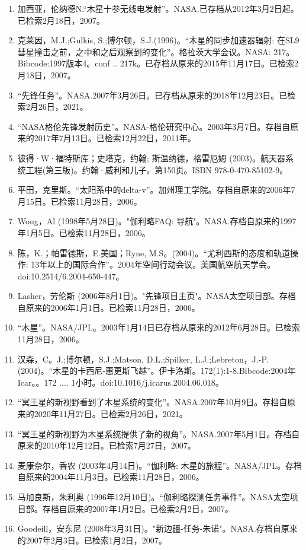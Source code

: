 \begin{enumerate}
\item 加西亚，伦纳德N.“木星十参无线电发射”。NASA.已存档从2012年3月2日起。已检索2月18日，2007。
\item 克莱因，M.J.;Gulkis, S.;博尔顿，S.J.(1996)。“木星的同步加速器辐射: 在SL9彗星撞击之前，之中和之后观察到的变化”。格拉茨大学会议。NASA: 217。Bibcode:1997版本4。conf .. 217k。已存档从原来的2015年11月17日。已检索2月18日，2007。
\item “先锋任务”。NASA.2007年3月26日。已存档从原来的2018年12月23日。已检索2月26日，2021。
\item “NASA格伦先锋发射历史”。NASA-格伦研究中心。2003年3月7日。存档自原来的2017年7月13日。已检索12月22日，2011年。
\item 彼得·W·福特斯库；史塔克，约翰; 斯温纳德，格雷厄姆 (2003)。航天器系统工程(第三版)。约翰·威利和儿子。第150页。ISBN 978-0-470-85102-9。
\item 平田，克里斯。“太阳系中的delta-v”。加州理工学院。存档自原来的2006年7月15日。已检索11月28日，2006。
\item Wong，Al (1998年5月28日)。"伽利略FAQ: 导航"。NASA.存档自原来的1997年1月5日。已检索11月28日，2006。
\item 陈，K.；帕雷德斯，E.美国；Ryne, M.S。(2004)。“尤利西斯的态度和轨道操作: 13年以上的国际合作”。2004年空间行动会议。美国航空航天学会。doi:10.2514/6.2004-650-447。
\item Lasher，劳伦斯 (2006年8月1日)。"先锋项目主页"。NASA太空项目部。存档自原来的2006年1月1日。已检索11月28日，2006。
\item “木星”。NASA/JPL。2003年1月14日已存档从原来的2012年6月28日。已检索11月28日，2006。
\item 汉森，C。J.;博尔顿，S.J.;Matson, D.L.;Spilker, L.J.;Lebreton，J.-P.(2004)。“木星的卡西尼-惠更斯飞越”。伊卡洛斯。172(1):1-8.Bibcode:2004年Icar。。172 .... 1小时。doi:10.1016/j.icarus.2004.06.018。
\item “冥王星的新视野看到了木星系统的变化”。NASA.2007年10月9日。存档自原来的2020年11月27日。已检索2月26日，2021。
\item “冥王星的新视野为木星系统提供了新的视角”。NASA.2007年5月1日。存档自原来的2010年12月12日。已检索7月27日，2007。
\item 麦康奈尔，香农 (2003年4月14日)。“伽利略: 木星的旅程”。NASA/JPL。存档自原来的2004年11月3日。已检索11月28日，2006。
\item 马加良斯，朱利奥 (1996年12月10日)。“伽利略探测任务事件”。NASA太空项目部。存档自原来的2007年1月2日。已检索2月2日，2007。
\item Goodeill，安东尼 (2008年3月31日)。"新边疆-任务-朱诺"。NASA.存档自原来的2007年2月3日。已检索1月2日，2007。

\end{enumerate}
